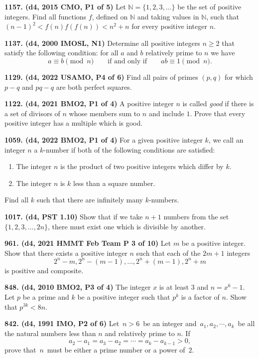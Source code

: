 \documentclass{article}
\begin{document}
\textbf{1157. (\color{red}d4\color{black}, 2015 CMO, P1 of 5)} Let $\mathbb N = \{1, 2, 3, \ldots \}$ be the set of positive integers. Find all functions $f$, defined on $\mathbb N$ and taking values in $\mathbb N$, such that $(n - 1)^2 < f(n)f(f(n)) < n^2 + n$ for every positive integer $n$.

\textbf{1137. (\color{red}d4\color{black}, 2000 IMOSL, N1)} Determine all positive integers $ n\geq 2$ that satisfy the following condition: for all $ a$ and $ b$ relatively prime to $ n$ we have\[a \equiv b \pmod n\qquad\text{if and only if}\qquad ab\equiv 1 \pmod n.\]

\textbf{1129. (\color{red}d4\color{black}, 2022 USAMO, P4 of 6)} Find all pairs of primes $(p, q)$ for which $p-q$ and $pq-q$ are both perfect squares.

\textbf{1122. (\color{red}d4\color{black}, 2021 BMO2, P1 of 4)} A positive integer $n$ is called \emph{good} if there is a set of divisors of $n$ whose members sum to $n$
and include $1$. Prove that every positive integer has a multiple which is good.

\textbf{1059. (\color{red}d4\color{black}, 2022 BMO2, P1 of 4)} For a given positive integer \(k\), we call an integer \(n\) a \(k\)-number if both of the following
conditions are satisfied:
\begin{enumerate}
    \item The integer \(n\) is the product of two positive integers which differ by \(k\).
    \item The integer \(n\) is \(k\) less than a square number.
\end{enumerate}
Find all \(k\) such that there are infinitely many \(k\)-numbers.

\textbf{1017. (\color{red}d4\color{black}, PST 1.10)} Show that if we take \(n+1\) numbers from the set \(\{1,2,3,\dots,2n\}\), there must exist one which is divisible by another.

\textbf{961. (\color{red}d4\color{black}, 2021 HMMT Feb Team P 3 of 10)} Let $m$ be a positive integer. Show that there exists a positive integer $n$ such that each of the
$2m + 1$ integers
\[
    2^n-m, 2^n-(m-1),\ldots,2^n+(m-1), 2^n+m
\]
is positive and composite.

\textbf{848. (\color{red}d4\color{black}, 2010 BMO2, P3 of 4)} The integer $x$ is at least $3$ and $n=x^6-1$. Let $p$ be a prime and $k$ be a positive integer such that $p^k$ is a factor of $n$. Show that $p^{3k}<8n$.

\textbf{842. (\color{red}d4\color{black}, 1991 IMO, P2 of 6)} Let $\,n > 6\,$ be an integer and $\,a_{1},a_{2},\cdots ,a_{k}\,$ be all the natural numbers less than $n$ and relatively prime to $n$. If \[a_{2} - a_{1} = a_{3} - a_{2} = \cdots = a_{k} - a_{k - 1} > 0,\] prove that $\,n\,$ must be either a prime number or a power of $\,2$.
\end{document}

